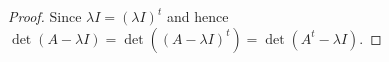\begin{Exercise}
	\begin{proof}
		Since $\lambda I = (\lambda I)^t$ and hence $\det(A-\lambda I) = \det( (A-\lambda I)^t ) = \det(A^t -\lambda I)$.
	\end{proof}
\end{Exercise}